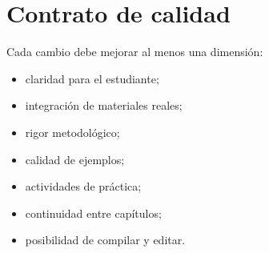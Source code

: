 \section{Contrato de calidad}

Cada cambio debe mejorar al menos una dimensión:

\begin{itemize}
  \item claridad para el estudiante;
  \item integración de materiales reales;
  \item rigor metodológico;
  \item calidad de ejemplos;
  \item actividades de práctica;
  \item continuidad entre capítulos;
  \item posibilidad de compilar y editar.
\end{itemize}

